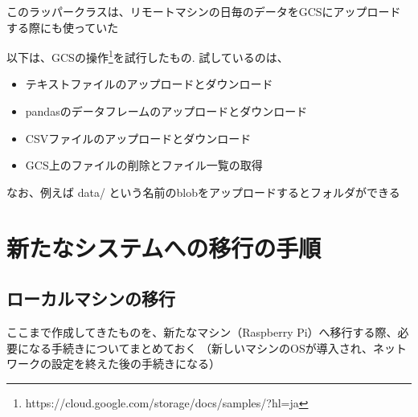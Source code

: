 \documentclass[12pt,a4paper,uplatex]{jsbook}
\begin{document}


このラッパークラスは、リモートマシンの日毎のデータをGCSにアップロードする際にも使っていた

以下は、GCSの操作\footnote{https://cloud.google.com/storage/docs/samples/?hl=ja}を試行したもの. 試しているのは、
\begin{itemize}
	\item テキストファイルのアップロードとダウンロード
	\item pandasのデータフレームのアップロードとダウンロード
	\item CSVファイルのアップロードとダウンロード
	\item GCS上のファイルの削除とファイル一覧の取得
\end{itemize}
なお、例えば data/ という名前のblobをアップロードするとフォルダができる

\newpage



\section{新たなシステムへの移行の手順}

\subsection{ローカルマシンの移行}

ここまで作成してきたものを、新たなマシン（Raspberry Pi）へ移行する際、必要になる手続きについてまとめておく
（新しいマシンのOSが導入され、ネットワークの設定を終えた後の手続きになる）
\end{document}

